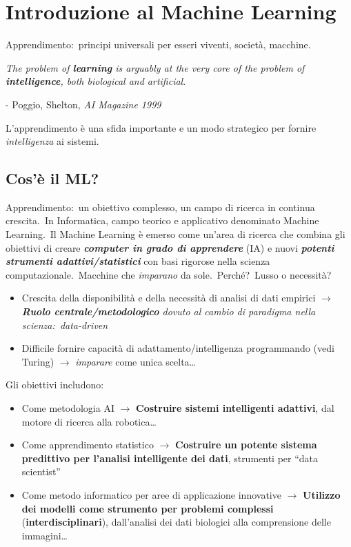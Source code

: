\chapter{Introduzione al Machine Learning}

Apprendimento:\ principi universali per esseri viventi, società, macchine.

\begin{center}
	\textit{The problem of \textbf{learning} is arguably at the very core of the problem of \textbf{intelligence}, both biological and artificial}.

	- Poggio, Shelton, \textit{AI Magazine 1999}
\end{center}

\noindent L'apprendimento è una sfida importante e un modo strategico per fornire \textit{intelligenza} ai sistemi.

\section{Cos'è il ML?}
Apprendimento:\ un obiettivo complesso, un campo di ricerca in continua crescita.\
In Informatica, campo teorico e applicativo denominato Machine Learning.\
Il Machine Learning è emerso come un'area di ricerca che combina gli obiettivi di creare \textbf{\textit{computer in grado di apprendere}} (IA) e nuovi \textbf{\textit{potenti strumenti adattivi/statistici}} con basi rigorose nella scienza computazionale.\
Macchine che \textit{imparano} da sole.\
Perché?\ Lusso o necessità?\

\begin{itemize}
	\item Crescita della disponibilità e della necessità di analisi di dati empirici $\rightarrow$ \textit{\textbf{Ruolo centrale/metodologico} dovuto al cambio di paradigma nella scienza:\ data-driven}
	\item Difficile fornire capacità di adattamento/intelligenza programmando (vedi Turing) $\rightarrow$ \textit{imparare} come unica scelta\dots
\end{itemize}

\noindent Gli obiettivi includono:

\begin{itemize}
	\item Come metodologia AI $\rightarrow$ \textbf{Costruire sistemi intelligenti adattivi}, dal motore di ricerca alla robotica\dots
	\item Come apprendimento statistico $\rightarrow$ \textbf{Costruire un potente sistema predittivo per l'analisi intelligente dei dati}, strumenti per ``data scientist''
	\item Come metodo informatico per aree di applicazione innovative $\rightarrow$ \textbf{Utilizzo dei modelli come strumento per problemi complessi} (\textbf{in\-terdisciplinari}), dall'analisi dei dati biologici alla comprensione delle immagini\dots
\end{itemize}

